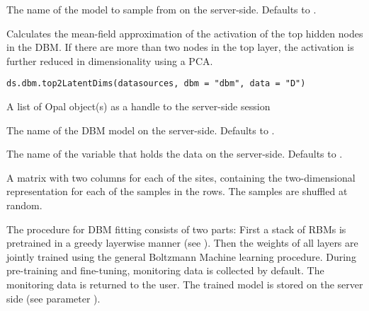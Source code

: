 %
\begin{Arguments}
\begin{ldescription}
\item[\code{dbm}] The name of the model to sample from on the server-side. Defaults to .
\end{ldescription}
\end{Arguments}
%
\begin{Description}\relax
Calculates the mean-field approximation of the activation of the top hidden nodes in
the DBM. If there are more than two nodes in the top layer, the activation is further
reduced in dimensionality using a PCA.
\end{Description}
%
\begin{Usage}
\begin{verbatim}
ds.dbm.top2LatentDims(datasources, dbm = "dbm", data = "D")
\end{verbatim}
\end{Usage}
%
\begin{Arguments}
\begin{ldescription}
\item[\code{datasources}] A list of Opal object(s) as a handle to the server-side session

\item[\code{dbm}] The name of the DBM model on the server-side. Defaults to .

\item[\code{data}] The name of the variable that holds the data on the server-side.
Defaults to .
\end{ldescription}
\end{Arguments}
%
\begin{Value}
A matrix with two columns for each of the sites,
containing the two-dimensional representation for
each of the samples in the rows. The samples are shuffled at random.
\end{Value}
%
\begin{Description}\relax
The procedure for DBM fitting consists of two parts:
First a stack of RBMs is pretrained in a greedy layerwise manner
(see ). Then the weights of all layers are jointly
trained using the general Boltzmann Machine learning procedure.
During pre-training and fine-tuning, monitoring data is collected by default.
The monitoring data is returned to the user.
The trained model is stored on the server side (see parameter ).
\end{Description}
